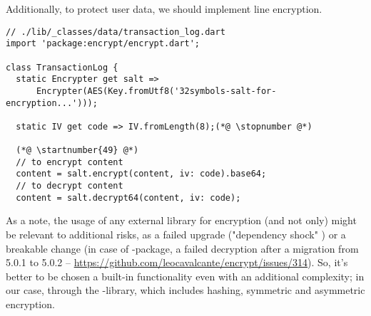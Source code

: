\noindent Additionally, to protect user data, we should implement line encryption.

\begin{lstlisting}
// ./lib/_classes/data/transaction_log.dart
import 'package:encrypt/encrypt.dart';

class TransactionLog {
  static Encrypter get salt =>
      Encrypter(AES(Key.fromUtf8('32symbols-salt-for-encryption...')));

  static IV get code => IV.fromLength(8);(*@ \stopnumber @*)

  (*@ \startnumber{49} @*)
  // to encrypt content
  content = salt.encrypt(content, iv: code).base64;
  // to decrypt content
  content = salt.decrypt64(content, iv: code);
\end{lstlisting}

\noindent As a note, the usage of any external library for encryption (and not only) might be relevant to additional 
risks, as a failed upgrade ("dependency shock" \cite{Inki23}) or a breakable change (in case of -package, a 
failed decryption after a migration from 5.0.1 to 5.0.2 -- 
\href{https://github.com/leocavalcante/encrypt/issues/314}{https://github.com/leocavalcante/encrypt/issues/314}).
So, it's better to be chosen a built-in functionality even with an additional complexity; in our case, through the 
-library, which includes hashing, symmetric and asymmetric encryption.
